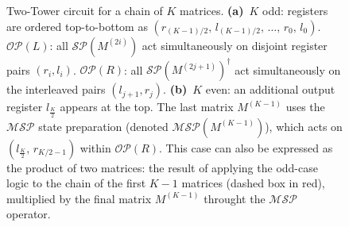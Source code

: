 \documentclass[a4paper,UKenglish,cleveref,autoref,thm-restate]{socg-lipics-v2021}
\newcommand{\SP}{\mathcal{SP}}        %
\newcommand{\MSP}{\mathcal{MSP}} %
\newcommand{\OP}{\mathcal{OP}}        %
\begin{document}
\begin{figure}[t]
\begin{minipage}[b]{0.48\linewidth}
    \label{fig:circuit-K-even}
  \end{minipage}
  \caption{Two-Tower circuit for a chain of $K$ matrices.
    \textbf{(a)}~$K$ odd: registers are ordered top-to-bottom as
    $(r_{(K-1)/2},\, l_{(K-1)/2},\, \ldots,\, r_0,\, l_0)$.
    $\OP(L)$: all $\SP(M^{(2i)})$ act simultaneously on
    disjoint register pairs $(r_i, l_i)$.
    $\OP(R)$: all $\SP(M^{(2j+1)})^\dagger$ act simultaneously
    on the interleaved pairs $(l_{j+1}, r_j)$.
    \textbf{(b)}~$K$ even: an additional output register $l_{\frac{K}{2}}$
    appears at the top.
    The last matrix $M^{(K-1)}$ uses the $\MSP$ state preparation
    (denoted $\MSP(M^{(K-1)})$), which acts on
   $(l_{\frac{K}{2}},\, r_{K/2-1})$ within $\OP(R)$. This case can also be expressed as the product of two matrices: the result of applying the odd-case logic to the chain of the first $K-1$ matrices (dashed box in red), multiplied by the final matrix $M^{(K-1)}$ throught the $\MSP$ operator.}
  \label{fig:circuit-K}
\end{figure}
\end{document}
